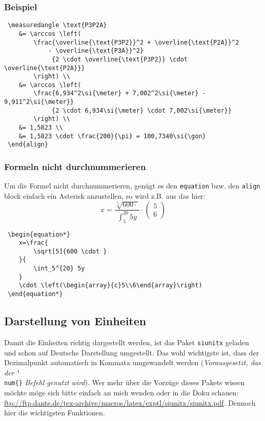 \subsubsection*{Beispiel}
\begin{lstlisting}
 \measuredangle \text{P3P2A}
 	&= \arccos \left(
 		\frac{\overline{\text{P3P2}}^2 + \overline{\text{P2A}}^2
 		    - \overline{\text{P3A}}^2}
 		     {2 \cdot \overline{\text{P3P2}} \cdot \overline{\text{P2A}}}
 		\right) \\
 	&= \arccos \left(
 		\frac{6,934^2\si{\meter} + 7,002^2\si{\meter} - 9,911^2\si{\meter}}
 		     {2 \cdot 6,934\si{\meter} \cdot 7,002\si{\meter}}
 		\right) \\
 	&= 1,5823 \\
 	&= 1,5823 \cdot \frac{200}{\pi} = 100,7340\si{\gon}
 \end{align}
\end{lstlisting}

\subsubsection{Formeln nicht durchnummerieren}
Um die Formel nicht durchnummerieren, genügt es den \texttt{equation} bzw. den \texttt{align} block einfach ein Asterisk anzustellen, so wird z.B. aus  das hier:
\begin{equation*}
	x=\frac{
	    \sqrt[5]{600 \cdot }
	}{
		\int_5^{20} 5y
	}
	\cdot \left(\begin{array}{c}5\\6\end{array}\right)
\end{equation*}
\begin{lstlisting}
 \begin{equation*}
 	x=\frac{
 	    \sqrt[5]{600 \cdot }
 	}{
 		\int_5^{20} 5y
 	}
 	\cdot \left(\begin{array}{c}5\\6\end{array}\right)
 \end{equation*}
\end{lstlisting}

\subsection{Darstellung von Einheiten}
Damit die Einheiten richtig dargestellt werden, ist das Paket \texttt{siunitx} geladen und schon auf Deutsche Darstellung umgestellt. Das wohl wichtigste ist, dass der Dezimalpunkt automatisch in Kommata umgewandelt werden (\textit{Vorausgesetzt, das der }\texttt{\char`\\num\{\}}\textit{ Befehl genutzt wird}). Wer mehr über die Vorzüge dieses Pakets wissen möchte möge sich bitte einfach an mich wenden oder in die Doku schauen: \url{ftp://ftp.dante.de/tex-archive/macros/latex/exptl/siunitx/siunitx.pdf}. Dennoch hier die wichtigsten Funktionen.
